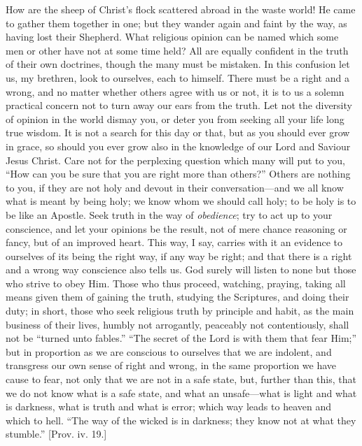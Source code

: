 How are the sheep of Christ's flock scattered abroad in the waste
world! He came to gather them together in one; but they wander again
and faint by the way, as having lost their Shepherd. What religious
opinion can be named which some men or other have not at some time
held? All are equally confident in the truth of their own doctrines,
though the many must be mistaken. In this confusion let us, my
brethren, look to ourselves, each to himself. There must be a right
and a wrong, and no matter whether others agree with us or not, it is
to us a solemn practical concern not to turn away our ears from the
truth. Let not the diversity of opinion in the world dismay you, or
deter you from seeking all your life long true wisdom. It is not a
search for this day or that, but as you should ever grow in grace, so
should you ever grow also in the knowledge of our Lord and Saviour
Jesus Christ. Care not for the perplexing question which many will put
to you, ``How can you be sure that you are right more than
others?'' Others are nothing to you, if they are not holy and
devout in their conversation—and we all know what is meant by being
holy; we know whom we should call holy; to be holy is to be like an
Apostle. Seek truth in the way of \emph{obedience}; try to act up to
your conscience, and let your opinions be the result, not of mere
chance reasoning or fancy, but of an improved heart. This way, I say,
carries with it an evidence to ourselves of its being the right way,
if any way be right; and that there is a right and a wrong way
conscience also tells us. God surely will listen to none but those who
strive to obey Him. Those who thus proceed, watching, praying, taking
all means given them of gaining the truth, studying the Scriptures,
and doing their duty; in short, those who seek religious truth by
principle and habit, as the main business of their lives, humbly not
arrogantly, peaceably not contentiously, shall not be ``turned
unto fables.'' ``The secret of the Lord is with them that fear
Him;'' but in proportion as we are conscious to ourselves that we
are indolent, and transgress our own sense of right and wrong, in the
same proportion we have cause to fear, not only that we are not in a
safe state, but, further than this, that we do not know what is a safe
state, and what an unsafe—what is light and what is darkness, what
is truth and what is error; which way leads to heaven and which to
hell. ``The way of the wicked is in darkness; they know not at
what they stumble.'' [Prov. iv. 19.]

